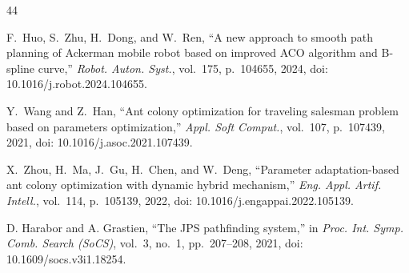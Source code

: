 \documentclass[lettersize,journal]{IEEEtran}
\begin{document}
\begin{thebibliography}{44}

F.~Huo, S.~Zhu, H.~Dong, and W.~Ren, ``A new approach to smooth path planning of Ackerman mobile robot based on improved ACO algorithm and B-spline curve,'' \textit{Robot. Auton. Syst.}, vol.~175, p.~104655, 2024, doi: 10.1016/j.robot.2024.104655.


Y.~Wang and Z.~Han, ``Ant colony optimization for traveling salesman problem based on parameters optimization,'' \textit{Appl. Soft Comput.}, vol.~107, p.~107439, 2021, doi: 10.1016/j.asoc.2021.107439.


X.~Zhou, H.~Ma, J.~Gu, H.~Chen, and W.~Deng, ``Parameter adaptation-based ant colony optimization with dynamic hybrid mechanism,'' \textit{Eng. Appl. Artif. Intell.}, vol.~114, p.~105139, 2022, doi: 10.1016/j.engappai.2022.105139.


D. Harabor and A. Grastien, ``The JPS pathfinding system,'' in \textit{Proc. Int. Symp. Comb. Search (SoCS)}, vol.~3, no.~1, pp.~207--208, 2021, doi: 10.1609/socs.v3i1.18254.

\end{thebibliography}
\end{document}
